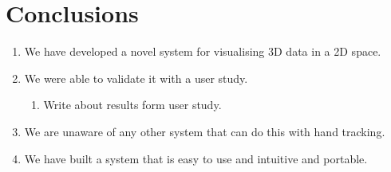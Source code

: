 \section{Conclusions}
\begin{enumerate}
	\item We have developed a novel system for visualising 3D data in a 2D space.
	\item We were able to validate it with a user study.
	\begin{enumerate}
		\item Write about results form user study.
	\end{enumerate}
	\item We are unaware of any other system that can do this with hand tracking. 
	\item We have built a system that is easy to use and intuitive and portable.
\end{enumerate}

